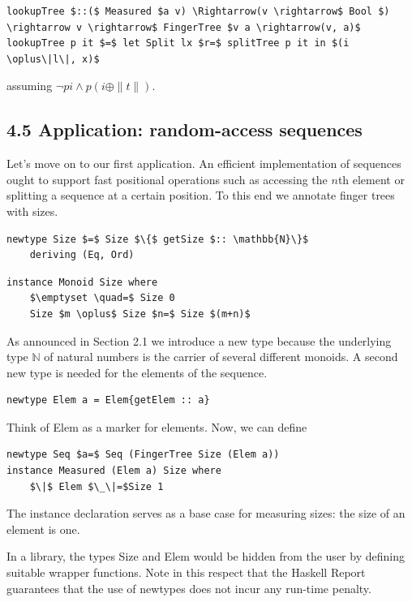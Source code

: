 \documentclass[10pt]{article}
\begin{document}
\begin{verbatim}
lookupTree $::($ Measured $a v) \Rightarrow(v \rightarrow$ Bool $) \rightarrow v \rightarrow$ FingerTree $v a \rightarrow(v, a)$
lookupTree p it $=$ let Split lx $r=$ splitTree p it in $(i \oplus\|l\|, x)$
\end{verbatim}

assuming $\neg p i \wedge p(i \oplus\|t\|)$.

\subsection*{4.5 Application: random-access sequences}
Let's move on to our first application. An efficient implementation of sequences ought to support fast positional operations such as accessing the $n$th element or splitting a sequence at a certain position. To this end we annotate finger trees with sizes.

\begin{verbatim}
newtype Size $=$ Size $\{$ getSize $:: \mathbb{N}\}$
    deriving (Eq, Ord)
\end{verbatim}

\begin{verbatim}
instance Monoid Size where
    $\emptyset \quad=$ Size 0
    Size $m \oplus$ Size $n=$ Size $(m+n)$
\end{verbatim}

As announced in Section 2.1 we introduce a new type because the underlying type $\mathbb{N}$ of natural numbers is the carrier of several different monoids. A second new type is needed for the elements of the sequence.

\begin{verbatim}
newtype Elem a = Elem{getElem :: a}
\end{verbatim}

Think of Elem as a marker for elements. Now, we can define

\begin{verbatim}
newtype Seq $a=$ Seq (FingerTree Size (Elem a))
instance Measured (Elem a) Size where
    $\|$ Elem $\_\|=$Size 1
\end{verbatim}

The instance declaration serves as a base case for measuring sizes: the size of an element is one.

In a library, the types Size and Elem would be hidden from the user by defining suitable wrapper functions. Note in this respect that the Haskell Report guarantees that the use of newtypes does not incur any run-time penalty.
\end{document}
